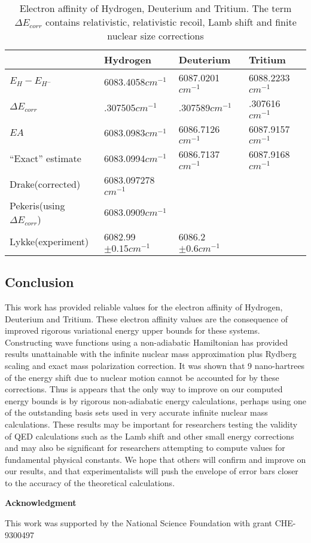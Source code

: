 \documentclass[12pt,thmsa]{article}
\begin{document}
\begin{table}[tbp] \centering%
\begin{tabular}{llll}
\hline\hline
& Hydrogen & Deuterium & Tritium \\ \hline
$E_H-E_{H^{-}}$ & 6083.4058$cm^{-1}$ & 6087.0201$cm^{-1}$ & 6088.2233$cm^{-1}
$ \\ 
$\Delta E_{corr}$ & .307505$cm^{-1}$ & .307589$cm^{-1}$ & .307616$cm^{-1}$
\\ 
$EA$ & 6083.0983$cm^{-1}$ & 6086.7126$cm^{-1}$ & 6087.9157$cm^{-1}$ \\ 
``Exact'' estimate & 6083.0994$cm^{-1}$ & 6086.7137$cm^{-1}$ & 6087.9168$%
cm^{-1}$ \\ \hline
Drake\cite{Drake88}(corrected) & 6083.097278$cm^{-1}$ &  &  \\ 
Pekeris\cite{Pekeris62}(using $\Delta E_{corr}$) & 6083.0909$cm^{-1}$ &  & 
\\ 
Lykke\cite{Lykke91}(experiment) & 6082.99$\pm 0.15cm^{-1}$ & 6086.2$\pm
0.6cm^{-1}$ &  \\ \hline\hline
\end{tabular}
\caption{Electron affinity of Hydrogen, Deuterium and Tritium. The  term $ \Delta E_{corr} $
contains relativistic, relativistic recoil, Lamb shift and finite nuclear size corrections   \label{EAtab}}%
\end{table}%

\subsection{Conclusion}

This work has provided reliable values for the electron affinity of
Hydrogen, Deuterium and Tritium. These electron affinity values are the
consequence of improved rigorous variational energy upper bounds for these
systems. Constructing wave functions using a non-adiabatic Hamiltonian has
provided results unattainable with the infinite nuclear mass approximation
plus Rydberg scaling and exact mass polarization correction. It was shown
that 9 nano-hartrees of the energy shift due to nuclear motion cannot be
accounted for by these corrections. Thus is appears that the only way to
improve on our computed energy bounds is by rigorous non-adiabatic energy
calculations, perhaps using one of the outstanding basis sets used in very
accurate infinite nuclear mass calculations. These results may be important
for researchers testing the validity of QED calculations such as the Lamb
shift and other small energy corrections and may also be significant for
researchers attempting to compute values for fundamental physical constants.
We hope that others will confirm and improve on our results, and that
experimentalists will push the envelope of error bars closer to the accuracy
of the theoretical calculations. 

\noindent \textbf{Acknowledgment}

This work was supported by the National Science Foundation with grant
CHE-9300497



\end{document}

